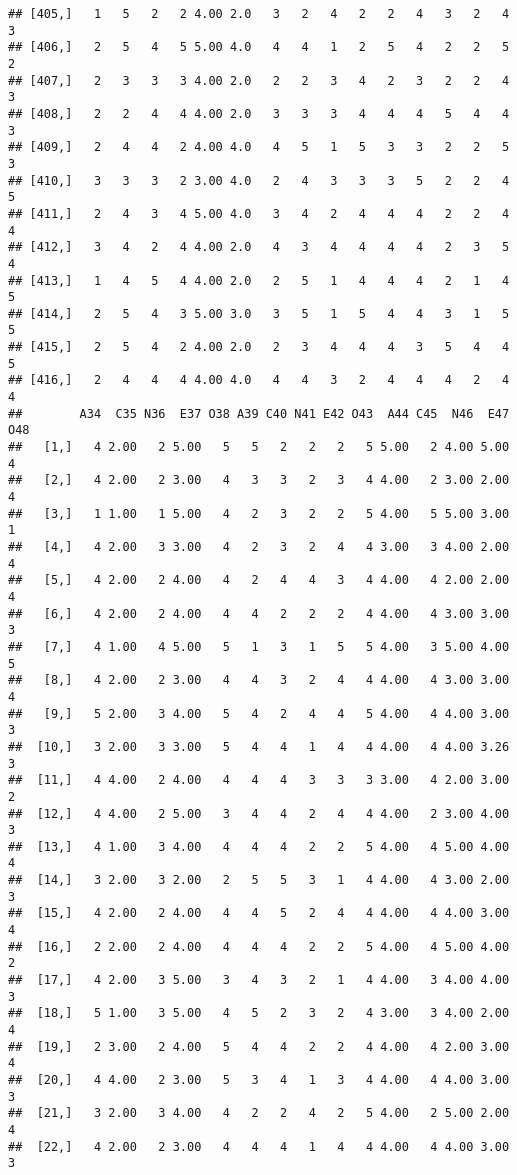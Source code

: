 \documentclass[]{article}
\begin{document}
\begin{verbatim}
## [405,]   1   5   2   2 4.00 2.0   3   2   4   2   2   4   3   2   4   3
## [406,]   2   5   4   5 5.00 4.0   4   4   1   2   5   4   2   2   5   2
## [407,]   2   3   3   3 4.00 2.0   2   2   3   4   2   3   2   2   4   3
## [408,]   2   2   4   4 4.00 2.0   3   3   3   4   4   4   5   4   4   3
## [409,]   2   4   4   2 4.00 4.0   4   5   1   5   3   3   2   2   5   3
## [410,]   3   3   3   2 3.00 4.0   2   4   3   3   3   5   2   2   4   5
## [411,]   2   4   3   4 5.00 4.0   3   4   2   4   4   4   2   2   4   4
## [412,]   3   4   2   4 4.00 2.0   4   3   4   4   4   4   2   3   5   4
## [413,]   1   4   5   4 4.00 2.0   2   5   1   4   4   4   2   1   4   5
## [414,]   2   5   4   3 5.00 3.0   3   5   1   5   4   4   3   1   5   5
## [415,]   2   5   4   2 4.00 2.0   2   3   4   4   4   3   5   4   4   5
## [416,]   2   4   4   4 4.00 4.0   4   4   3   2   4   4   4   2   4   4
##        A34  C35 N36  E37 O38 A39 C40 N41 E42 O43  A44 C45  N46  E47 O48
##   [1,]   4 2.00   2 5.00   5   5   2   2   2   5 5.00   2 4.00 5.00   4
##   [2,]   4 2.00   2 3.00   4   3   3   2   3   4 4.00   2 3.00 2.00   4
##   [3,]   1 1.00   1 5.00   4   2   3   2   2   5 4.00   5 5.00 3.00   1
##   [4,]   4 2.00   3 3.00   4   2   3   2   4   4 3.00   3 4.00 2.00   4
##   [5,]   4 2.00   2 4.00   4   2   4   4   3   4 4.00   4 2.00 2.00   4
##   [6,]   4 2.00   2 4.00   4   4   2   2   2   4 4.00   4 3.00 3.00   3
##   [7,]   4 1.00   4 5.00   5   1   3   1   5   5 4.00   3 5.00 4.00   5
##   [8,]   4 2.00   2 3.00   4   4   3   2   4   4 4.00   4 3.00 3.00   4
##   [9,]   5 2.00   3 4.00   5   4   2   4   4   5 4.00   4 4.00 3.00   3
##  [10,]   3 2.00   3 3.00   5   4   4   1   4   4 4.00   4 4.00 3.26   3
##  [11,]   4 4.00   2 4.00   4   4   4   3   3   3 3.00   4 2.00 3.00   2
##  [12,]   4 4.00   2 5.00   3   4   4   2   4   4 4.00   2 3.00 4.00   3
##  [13,]   4 1.00   3 4.00   4   4   4   2   2   5 4.00   4 5.00 4.00   4
##  [14,]   3 2.00   3 2.00   2   5   5   3   1   4 4.00   4 3.00 2.00   3
##  [15,]   4 2.00   2 4.00   4   4   5   2   4   4 4.00   4 4.00 3.00   4
##  [16,]   2 2.00   2 4.00   4   4   4   2   2   5 4.00   4 5.00 4.00   2
##  [17,]   4 2.00   3 5.00   3   4   3   2   1   4 4.00   3 4.00 4.00   3
##  [18,]   5 1.00   3 5.00   4   5   2   3   2   4 3.00   3 4.00 2.00   4
##  [19,]   2 3.00   2 4.00   5   4   4   2   2   4 4.00   4 2.00 3.00   4
##  [20,]   4 4.00   2 3.00   5   3   4   1   3   4 4.00   4 4.00 3.00   3
##  [21,]   3 2.00   3 4.00   4   2   2   4   2   5 4.00   2 5.00 2.00   4
##  [22,]   4 2.00   2 3.00   4   4   4   1   4   4 4.00   4 4.00 3.00   3

\end{verbatim}
\end{document}
